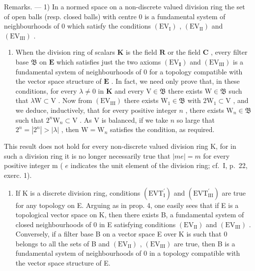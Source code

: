Remarks. --- 1) In a normed space on a non-discrete valued division ring the set of open balls (resp. closed balls) with centre 0 is a fundamental system of neighbourhoods of 0 which satisfy the conditions \((\mathrm{EV}_{\mathrm{I}})\) , \((\mathrm{EV}_{\mathrm{II}})\) and \((\mathrm{EV}_{\mathrm{III}})\) .

\begin{enumerate}
\def\labelenumi{\arabic{enumi})}
\setcounter{enumi}{1}
\tightlist
\item
  When the division ring of scalars \(\mathbf{K}\) is the field \(\mathbf{R}\) or the field \(\mathbf{C}\) , every filter base \(\mathfrak{B}\) on \(\mathbf{E}\) which satisfies just the two axioms \((\mathrm{EV}_{\mathbf{I}})\) and \((\mathrm{EV}_{\mathrm{III}})\) is a fundamental system of neighbourhoods of 0 for a topology compatible with the vector space structure of \(\mathbf{E}\) . In fact, we need only prove that, in these conditions, for every \(\lambda \neq 0\) in \(\mathbf{K}\) and every \(\mathrm{V} \in \mathfrak{B}\) there exists \(\mathrm{W} \in \mathfrak{B}\) such that \(\lambda \mathrm{W} \subset \mathrm{V}\) . Now from \((\mathrm{EV}_{\mathrm{III}})\) there exists \(\mathrm{W}_{1} \in \mathfrak{B}\) with \(2\mathrm{W}_{1} \subset \mathrm{V}\) , and we deduce, inductively, that for every positive integer \(n\) , there exists \(\mathrm{W}_{n} \in \mathfrak{B}\) such that \(2^{n}\mathrm{W}_{n} \subset \mathrm{V}\) . As \(\mathrm{V}\) is balanced, if we take \(n\) so large that \(2^{n} = |2^{n}| > |\lambda|\) , then \(\mathrm{W} = \mathrm{W}_{n}\) satisfies the condition, as required.
\end{enumerate}

This result does not hold for every non-discrete valued division ring K, for in such a division ring it is no longer necessarily true that \(|me| = m\) for every positive integer m ( \(e\) indicates the unit element of the division ring; cf.~I, p.~22, exerc. 1).

\begin{enumerate}
\def\labelenumi{\arabic{enumi})}
\setcounter{enumi}{2}
\tightlist
\item
  If K is a discrete division ring, conditions \((\mathrm{EVT}_{\mathrm{I}}^{\prime})\) and \((\mathrm{EVT}_{\mathrm{III}}^{\prime})\) are true for any topology on E. Arguing as in prop. 4, one easily sees that if E is a topological vector space on K, then there exists B, a fundamental system of closed neighbourhoods of 0 in E satisfying conditions \((\mathrm{EV}_{\mathrm{II}})\) and \((\mathrm{EV}_{\mathrm{III}})\) . Conversely, if a filter base B on a vector space E over K is such that 0 belongs to all the sets of B and \((\mathrm{EV}_{\mathrm{II}})\) , \((\mathrm{EV}_{\mathrm{III}})\) are true, then B is a fundamental system of neighbourhoods of 0 in a topology compatible with the vector space structure of E.
\end{enumerate}

